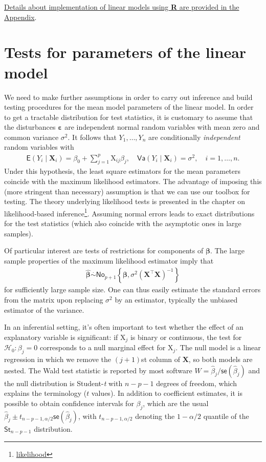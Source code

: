 \documentclass[
  11pt,
  letterpaper,
]{book}
\renewcommand{\href}[2]{#2\footnote{\url{#1}}}
\theoremstyle{definition}
\theoremstyle{definition}
\theoremstyle{definition}
\theoremstyle{definition}
\theoremstyle{remark}
\begin{document}
\protect\hyperlink{rlmfunc}{Details about implementation of linear models using \textbf{R} are provided in the Appendix}.

\hypertarget{test-lm}{%
\section{Tests for parameters of the linear model}\label{test-lm}}

We need to make further assumptions in order to carry out inference and build testing procedures for the mean model parameters of the linear model. In order to get a tractable distribution for test statistics, it is customary to assume that the disturbances \(\boldsymbol{\varepsilon}\) are independent normal random variables with mean zero and common variance \(\sigma^2\). It follows that \(Y_1, \ldots, Y_n\) are conditionally \emph{independent} random variables with
\begin{align*}
\mathsf{E}(Y_i \mid \mathbf{X}_i)=\beta_0 + \sum_{j=1}^p \mathrm{X}_{ij}\beta_j, \quad  \mathsf{Va}(Y_i\mid \mathbf{X}_i)= \sigma^2, \quad i=1, \ldots, n.
\end{align*}
Under this hypothesis, the least square estimators for the mean parameters coincide with the maximum likelihood estimators. The advantage of imposing this (more stringent than necessary) assumption is that we can use our toolbox for testing. The theory underlying likelihood tests is presented in the chapter on \href{likelihood}{likelihood-based inference}. Assuming normal errors leads to exact distributions for the test statistics (which also coincide with the asymptotic ones in large samples).

Of particular interest are tests of restrictions for components of \(\boldsymbol{\beta}\). The large sample properties of the maximum likelihood estimator imply that
\begin{align*}
\widehat{\boldsymbol{\beta}} \stackrel{\cdot}{\sim}\mathsf{No}_{p+1}\left\{\boldsymbol{\beta}, \sigma^2(\mathbf{X}^\top\mathbf{X})^{-1}\right\}
\end{align*}
for sufficiently large sample size. One can thus easily estimate the standard errors from the matrix upon replacing \(\sigma^2\) by an estimator, typically the unbiased estimator of the variance.

In an inferential setting, it's often important to test whether the effect of an explanatory variable is significant: if \(\mathrm{X}_j\) is binary or continuous, the test for \(\mathscr{H}_0: \beta_j=0\) corresponds to a null marginal effect for \(\mathrm{X}_j\). The null model is a linear regression in which we remove the \((j+1)\)st column of \(\mathbf{X}\), so both models are nested. The Wald test statistic is reported by most software \(W=\widehat{\beta}_j/\mathsf{se}(\widehat{\beta}_j)\) and the null distribution is Student-\emph{t} with \(n-p-1\) degrees of freedom, which explains the terminology (\(t\) values). In addition to coefficient estimates, it is possible to obtain confidence intervals for \(\beta_j\), which are the usual \(\widehat{\beta}_j \pm t_{n-p-1,\alpha/2} \mathsf{se}(\widehat{\beta}_j)\), with \(t_{n-p-1,\alpha/2}\) denoting the \(1-\alpha/2\) quantile of the \(\mathsf{St}_{n-p-1}\) distribution.
\end{document}
